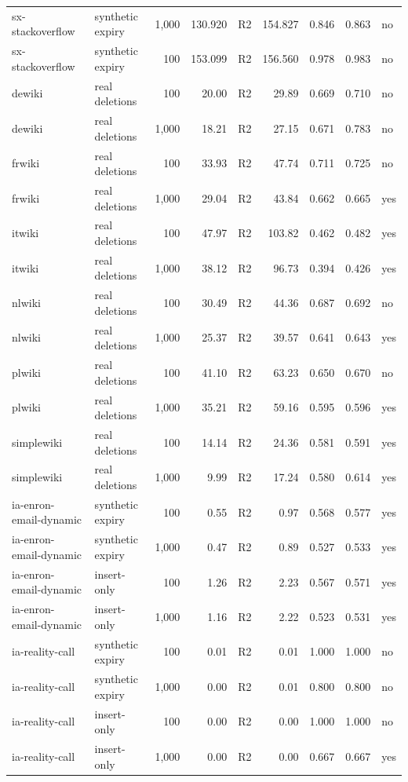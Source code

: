 \begin{table}[p]
\begin{tabular}{llrrlrrrl}
sx-stackoverflow & synthetic expiry & 1,000 & 130.920 & R2 & 154.827 & 0.846 & 0.863 & no \\
sx-stackoverflow & synthetic expiry & 100 & 153.099 & R2 & 156.560 & 0.978 & 0.983 & no \\
dewiki & real deletions & 100 & 20.00 & R2 & 29.89 & 0.669 & 0.710 & no \\
dewiki & real deletions & 1,000 & 18.21 & R2 & 27.15 & 0.671 & 0.783 & no \\
frwiki & real deletions & 100 & 33.93 & R2 & 47.74 & 0.711 & 0.725 & no \\
frwiki & real deletions & 1,000 & 29.04 & R2 & 43.84 & 0.662 & 0.665 & yes \\
itwiki & real deletions & 100 & 47.97 & R2 & 103.82 & 0.462 & 0.482 & yes \\
itwiki & real deletions & 1,000 & 38.12 & R2 & 96.73 & 0.394 & 0.426 & yes \\
nlwiki & real deletions & 100 & 30.49 & R2 & 44.36 & 0.687 & 0.692 & no \\
nlwiki & real deletions & 1,000 & 25.37 & R2 & 39.57 & 0.641 & 0.643 & yes \\
plwiki & real deletions & 100 & 41.10 & R2 & 63.23 & 0.650 & 0.670 & no \\
plwiki & real deletions & 1,000 & 35.21 & R2 & 59.16 & 0.595 & 0.596 & yes \\
simplewiki & real deletions & 100 & 14.14 & R2 & 24.36 & 0.581 & 0.591 & yes \\
simplewiki & real deletions & 1,000 & 9.99 & R2 & 17.24 & 0.580 & 0.614 & yes \\
ia-enron-email-dynamic & synthetic expiry & 100 & 0.55 & R2 & 0.97 & 0.568 & 0.577 & yes \\
ia-enron-email-dynamic & synthetic expiry & 1,000 & 0.47 & R2 & 0.89 & 0.527 & 0.533 & yes \\
ia-enron-email-dynamic & insert-only & 100 & 1.26 & R2 & 2.23 & 0.567 & 0.571 & yes \\
ia-enron-email-dynamic & insert-only & 1,000 & 1.16 & R2 & 2.22 & 0.523 & 0.531 & yes \\
ia-reality-call & synthetic expiry & 100 & 0.01 & R2 & 0.01 & 1.000 & 1.000 & no \\
ia-reality-call & synthetic expiry & 1,000 & 0.00 & R2 & 0.01 & 0.800 & 0.800 & no \\
ia-reality-call & insert-only & 100 & 0.00 & R2 & 0.00 & 1.000 & 1.000 & no \\
ia-reality-call & insert-only & 1,000 & 0.00 & R2 & 0.00 & 0.667 & 0.667 & yes \\

\end{tabular}
\end{table}
